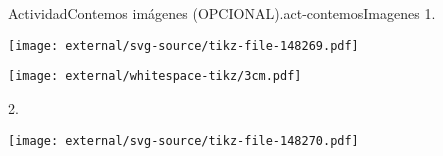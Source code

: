 \documentclass[14pt]{extarticle}
\begin{document}
\begin{activity}{Actividad}{Contemos imágenes (OPCIONAL).}{act-contemosImagenes}%
1.%
\begin{image}{0}{1}{0}{}%
\texttt{[image: external/svg-source/tikz-file-148269.pdf]}
\end{image}%
\begin{image}{0}{1}{0}{}%
\texttt{[image: external/whitespace-tikz/3cm.pdf]}
\end{image}%
2.%
\begin{image}{0}{1}{0}{}%
\texttt{[image: external/svg-source/tikz-file-148270.pdf]}
\end{image}%
\end{activity}
\end{document}
